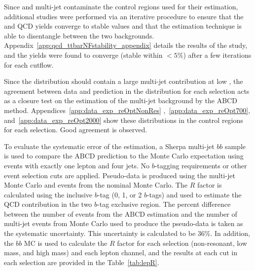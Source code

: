 Since \ttbar and  multi-jet contaminate the control
regions used for their estimation,  additional studies were
performed via an iterative procedure to ensure that the \ttbar and QCD
yields converge to stable values and that the estimation technique is
able to disentangle between the two backgrounds.
Appendix~\ref{app:qcd_ttbarNFstability_appendix} details the results of the study, and the yields 
were found to converge (stable within $<5\%$) after a few iterations for each cutflow.

Since the \mtw distribution should contain a large multi-jet contribution at low \mtw, the agreement 
between data and prediction in the \mtw distribution for each selection acts as a closure test on 
the estimation of the multi-jet background by the ABCD method. Appendices~\ref{app:data_exp_reOptNonRes}
,~\ref{app:data_exp_reOpt700}, and~\ref{app:data_exp_reOpt2000} show these distributions in the 
\ttbar control regions for each selection. Good agreement is observed.

To evaluate the systematic error of the estimation, a Sherpa multi-jet $bb$ sample is used to compare 
the ABCD prediction to the Monte Carlo expectation using events with exactly one lepton and four jets. 
No $b$-tagging requirements or other event selection cuts are applied. Pseudo-data is produced using
the multi-jet Monte Carlo and events from the nominal \ttbar Monte Carlo. The $R$ factor is calculated
using the inclusive $b$-tag (0, 1, or 2 $b$-tags) and used to estimate the QCD contribution in the two
$b$-tag exclusive region. The percent difference between the number of events from the ABCD estimation 
and the number of multi-jet events from Monte Carlo used to produce the pseudo-data is taken as the 
systematic uncertainty. This uncertainty is calculated to be 36\%. In addition, the $bb$ MC is used to
calculate the $R$ factor for each selection (non-resonant, low mass, and high mass) and each lepton 
channel, and the results at each cut in each selection are provided in the Table~\ref{tab:lepR}. 

